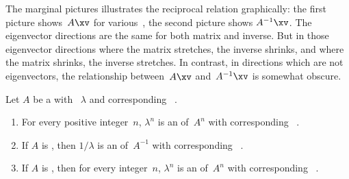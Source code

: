 \begin{example}
\begin{itemize}
The marginal pictures illustrates the reciprocal relation graphically:
the first picture shows~\(A\xv\) for various~\xv, the second picture shows \(A^{-1}\xv\).
The eigenvector directions are the same for both matrix and inverse.
But in those eigenvector directions where the matrix stretches, the inverse shrinks, and where the matrix shrinks, the inverse stretches.
In contrast, in directions which are not eigenvectors, the  relationship between~\(A\xv\) and~\(A^{-1}\xv\) is somewhat obscure.
\end{itemize}
\end{example}




\begin{theorem} \label{thm:ematpow} 
Let \(A\) be a  with ~\(\lambda\) and corresponding ~\xv.
\begin{enumerate}
\item\label{thm:ematpow:i} For every positive integer~\(n\), \(\lambda^n\) is an  of~\(A^n\) with corresponding ~\xv.
\item\label{thm:ematpow:ii} If \(A\) is , then \(1/\lambda\) is an  of~\(A^{-1}\) with corresponding ~\xv.
\item\label{thm:ematpow:iii} If \(A\) is , then for every integer~\(n\), \(\lambda^n\) is an  of~\(A^n\) with corresponding ~\xv.
\end{enumerate}
\end{theorem}
